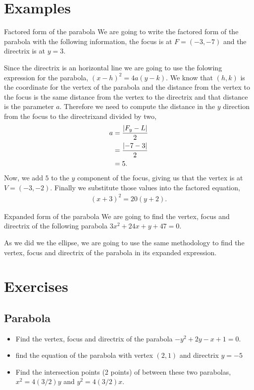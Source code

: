 \documentclass[../main-exe.tex]{subfiles}
\begin{document}
\section{Examples}

\begin{example}{Factored form of the parabola}{}
We are going to write the factored form of the parabola with the following information, the focus is at $F=(-3,-7)$ and the directrix is at $y=3$.

Since the directrix is an horizontal line we are going to use the folowing expression for the parabola, $(x-h)^2=4a(y-k)$.
We know that $(h,k)$ is the coordinate for the vertex of the parabola and the distance from the vertex to the focus is the same distance from the vertex to the directrix and that distance is the parameter $a$.
Therefore we need to compute the distance in the $y$ direction from the focus to the directrixand divided by two,
\begin{align*}
    a &= \frac{\abs{F_y - L}}{2} \\
      &= \frac{\abs{-7-3}}{2} \\
      &= 5.
\end{align*}
Now, we add $5$ to the $y$ component of the focus, giving us that the vertex is at $V=(-3,-2)$.
Finally we substitute those values into the factored equation,
\begin{gather*}
    (x+3)^2=20(y+2).
\end{gather*}

\end{example}

\begin{example}{Expanded form of the parabola}{}
We are going to find the vertex, focus and directrix of the following parabola $3x^2+24x+y+47=0$.

As we did we the ellipse, we are going to use the same methodology to find the vertex, focus and directrix of the parabola in its expanded expression.

\end{example}

\section{Exercises}

\subsection{Parabola}

\begin{itemize}
    \item Find the vertex, focus and directrix of the parabola $-y^2+2y-x+1=0$.
    \item find the equation of the parabola with vertex $(2,1)$ and directrix $y=-5$
    \item Find the intersection points (2 points) of between these two parabolas, $x^2=4(3/2)y$ and $y^2=4(3/2)x$.
\end{itemize}
\end{document}
